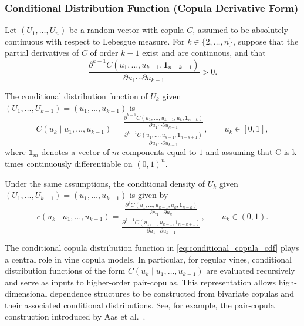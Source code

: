 \subsubsection*{Conditional Distribution Function (Copula Derivative Form)}

Let $(U_1,\ldots,U_n)$ be a random vector with copula $C$, assumed to be
absolutely continuous with respect to Lebesgue measure.
For $k \in \{2,\ldots,n\}$, suppose that the partial derivatives of $C$ of order
$k-1$ exist and are continuous, and that
\[
\frac{\partial^{k-1} C(u_1,\ldots,u_{k-1}, \mathbf{1}_{n-k+1})}
{\partial u_1\cdots\partial u_{k-1}}
> 0.
\]

\begin{theorem}
The conditional distribution function of $U_k$ given
$(U_1,\ldots,U_{k-1})=(u_1,\ldots,u_{k-1})$ is
\begin{equation}\label{eq:conditional_copula_cdf}
C(u_k \mid u_1,\ldots,u_{k-1})
=
\frac{
\displaystyle
\frac{\partial^{k-1} C(u_1,\ldots,u_{k-1}, u_k, \mathbf{1}_{n-k})}
{\partial u_1\cdots\partial u_{k-1}}
}{
\displaystyle
\frac{\partial^{k-1} C(u_1,\ldots,u_{k-1}, \mathbf{1}_{n-k+1})}
{\partial u_1\cdots\partial u_{k-1}}
},
\qquad u_k \in [0,1],
\end{equation}
where $\mathbf{1}_m$ denotes a vector of $m$ components equal to $1$ and assuming that C is k-times continuously differentiable on $(0,1)^n$.
\end{theorem}

\begin{corollary}
Under the same assumptions, the conditional density of $U_k$ given
$(U_1,\ldots,U_{k-1})=(u_1,\ldots,u_{k-1})$ is given by
\begin{equation}\label{eq:conditional_copula_densitya}
c(u_k \mid u_1,\ldots,u_{k-1})
=
\frac{
\displaystyle
\frac{\partial^{k} C(u_1,\ldots,u_{k-1}, u_k, \mathbf{1}_{n-k})}
{\partial u_1\cdots\partial u_{k}}
}{
\displaystyle
\frac{\partial^{k-1} C(u_1,\ldots,u_{k-1}, \mathbf{1}_{n-k+1})}
{\partial u_1\cdots\partial u_{k-1}}
},
\qquad u_k \in (0,1).
\end{equation}
\end{corollary}

\begin{remarkbox}
\begin{remarkT}
The conditional copula distribution function in
\eqref{eq:conditional_copula_cdf} plays a central role in vine copula models.
In particular, for regular vines, conditional distribution functions of the
form $C(u_k \mid u_1,\ldots,u_{k-1})$ are evaluated recursively and serve as inputs to higher-order pair-copulas.
This representation allows high-dimensional dependence structures to be
constructed from bivariate copulas and their associated conditional
distributions. See, for example, the pair-copula construction introduced by
Aas et al.~\cite{Aas2009}.
\end{remarkT}
\end{remarkbox}

